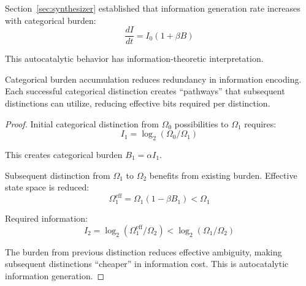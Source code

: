 Section~\ref{sec:synthesizer} established that information generation rate increases with categorical burden:
\begin{equation}
\frac{dI}{dt} = I_0(1 + \beta B)
\end{equation}

This autocatalytic behavior has information-theoretic interpretation.

\begin{proposition}
\label{prop:redundancy_reduction}
Categorical burden accumulation reduces redundancy in information encoding. Each successful categorical distinction creates ``pathways'' that subsequent distinctions can utilize, reducing effective bits required per distinction.
\end{proposition}

\begin{proof}
Initial categorical distinction from $\Omega_0$ possibilities to $\Omega_1$ requires:
\begin{equation}
I_1 = \log_2(\Omega_0/\Omega_1)
\end{equation}

This creates categorical burden $B_1 = \alpha I_1$.

Subsequent distinction from $\Omega_1$ to $\Omega_2$ benefits from existing burden. Effective state space is reduced:
\begin{equation}
\Omega_1^{\text{eff}} = \Omega_1 (1 - \beta B_1) < \Omega_1
\end{equation}

Required information:
\begin{equation}
I_2 = \log_2(\Omega_1^{\text{eff}}/\Omega_2) < \log_2(\Omega_1/\Omega_2)
\end{equation}

The burden from previous distinction reduces effective ambiguity, making subsequent distinctions ``cheaper'' in information cost. This is autocatalytic information generation.
\end{proof}

